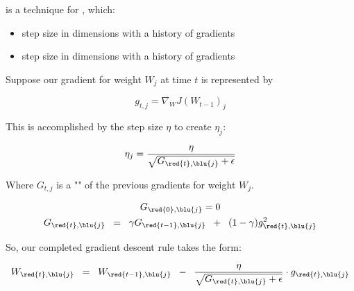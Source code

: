             \begin{definition}
                 is a technique for , which:

                \begin{itemize}
                    \item {} step size in dimensions with a history of  gradients
                    \item {} step size in dimensions with a history of  gradients
                \end{itemize}

                Suppose our gradient for weight $W_j$ at time $t$ is represented by

                \begin{equation*}
                    g_{t,j} = \nabla_{W}J(W_{t-1})_j
                \end{equation*}

                    \subsecdiv

                This is accomplished by  the step size $\eta$ to create $\eta_j$:

                \begin{equation*}
                    \eta_j = \frac{\eta}{ \sqrt{G_{\red{t},\blu{j}}+\epsilon} }
                \end{equation*}

                Where $G_{t,j}$ is a "" of the previous gradients for weight $W_j$.

                \begin{equation*}  
                    \begin{gathered}
                        G_{\red{0},\blu{j}} = 0 \\
                        G_{\red{t},\blu{j}} \;\;=\;\; 
                        \gamma G_{\red{t-1},\blu{j}} \;\;+\;\;
                        (1-\gamma) g_{\red{t},\blu{j}}^2
                    \end{gathered}
                \end{equation*}

                So, our completed gradient descent rule takes the form:

                \begin{equation*}
                    W_{\red{t},\blu{j}} \;\;=\;\; 
                    W_{\red{t-1},\blu{j}}  \;\;-\;\; 
                    \frac{\eta}{ \sqrt{G_{\red{t},\blu{j}}+\epsilon} } \cdot g_{\red{t},\blu{j}}
                \end{equation*}
                
            \end{definition}

